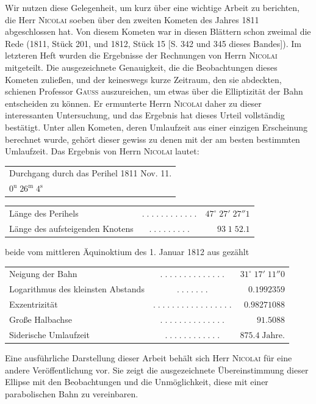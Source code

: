 \par\indent Wir nutzen diese Gelegenheit, um kurz über eine wichtige Arbeit zu berichten, die Herr \textsc{Nicolai} soeben über den zweiten Kometen des Jahres 1811 abgeschlossen hat. Von diesem Kometen war in diesen Blättern schon zweimal die Rede (1811, Stück 201, und 1812, Stück 15 [S. 342 und 345 dieses Bandes]). Im letzteren Heft wurden die Ergebnisse der Rechnungen von Herrn \textsc{Nicolai} mitgeteilt. Die ausgezeichnete Genauigkeit, die die Beobachtungen dieses Kometen zuließen, und der keineswegs kurze Zeitraum, den sie abdeckten, schienen Professor \textsc{Gauss} auszureichen, um etwas über die Elliptizität der Bahn entscheiden zu können. Er ermunterte Herrn \textsc{Nicolai} daher zu dieser interessanten Untersuchung, und das Ergebnis hat dieses Urteil vollständig bestätigt. Unter allen Kometen, deren Umlaufzeit aus einer einzigen Erscheinung berechnet wurde, gehört dieser gewiss zu denen mit der am besten bestimmten Umlaufzeit. Das Ergebnis von Herrn \textsc{Nicolai} lautet:

\medskip
\begin{center}\fontsize{10}{12}\selectfont\setlength{\tabcolsep}{2pt}\renewcommand{\arraystretch}{1.15}\begin{tabular}{l}
Durchgang durch das Perihel 1811 Nov. 11.\\$0^{\mathrm u}\;26^{\mathrm m}\;4^{\mathrm s}$
\end{tabular}\end{center}
\begin{center}\fontsize{9}{11}\selectfont\setlength{\tabcolsep}{2pt}\renewcommand{\arraystretch}{1.15}\begin{tabular}{lcr}
Länge des Perihels & $.\;.\;.\;.\;.\;.\;.\;.\;.\;.\;.\;.$ & $47^\circ\;27'\;27''1$\\
Länge des aufsteigenden Knotens & $.\;.\;.\;.\;.\;.\;.\;.\;.$ & $93\;1\;52.1$\\
\end{tabular}\end{center}
\noindent beide vom mittleren Äquinoktium des 1. Januar 1812 aus gezählt
\begin{center}\fontsize{9}{11}\selectfont\setlength{\tabcolsep}{2pt}\renewcommand{\arraystretch}{1.15}\begin{tabular}{lcr}
Neigung der Bahn & $.\;.\;.\;.\;.\;.\;.\;.\;.\;.\;.\;.\;.\;.$ & $31^\circ\;17'\;11''0$\\
Logarithmus des kleinsten Abstands & $.\;.\;.\;.\;.\;.\;.$ & $0.1992359$\\
Exzentrizität & $.\;.\;.\;.\;.\;.\;.\;.\;.\;.\;.\;.\;.\;.\;.\;.\;.$ & $0.98271088$\\
Große Halbachse & $.\;.\;.\;.\;.\;.\;.\;.\;.\;.\;.\;.\;.\;.$ & $91.5088$\\
Siderische Umlaufzeit & $.\;.\;.\;.\;.\;.\;.\;.\;.\;.\;.\;.$ & $875.4\;\text{Jahre.}$\\
\end{tabular}\end{center}

\par\indent Eine ausführliche Darstellung dieser Arbeit behält sich Herr \textsc{Nicolai} für eine andere Veröffentlichung vor. Sie zeigt die ausgezeichnete Übereinstimmung dieser Ellipse mit den Beobachtungen und die Unmöglichkeit, diese mit einer parabolischen Bahn zu vereinbaren.
